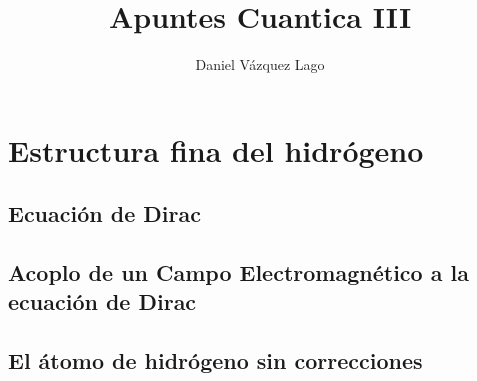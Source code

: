 \documentclass[12pt,a4paper]{article}
\title{Apuntes Cuantica III}
\author{Daniel Vázquez Lago}
\numberwithin{equation}{section}
\numberwithin{figure}{section}
\begin{document}
\maketitle

\newpage

\tableofcontents

\newpage

\section{Estructura fina del hidrógeno}


\subsection{Ecuación de Dirac}

\subsection{Acoplo de un Campo Electromagnético a la ecuación de Dirac}

\subsection{El átomo de hidrógeno sin correcciones}
\end{document}
